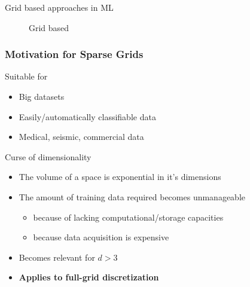 \begin{frame}
\begin{block}{Grid based approaches in ML}
\begin{figure}[!htb]
      \vspace{-12px}
      \caption{Grid based}
      \endminipage
    \end{figure}
  \end{block}
\end{frame}

\begin{frame}
  \frametitle{Motivation for Sparse Grids}
  \topline
  \vspace{-10px}
  \begin{block}{Suitable for}
    \begin{itemize}
      \item Big datasets
      \item Easily/automatically classifiable data
      \item Medical, seismic, commercial data
    \end{itemize}
  \end{block}
  \begin{block}{Curse of dimensionality}
    \begin{itemize}
    \item The volume of a space is exponential in it's dimensions
    \item The amount of training data required becomes unmanageable
      \begin{itemize}
      \item because of lacking computational/storage capacities
      \item because data acquisition is expensive
      \end{itemize}
    \item Becomes relevant for $d > 3$
    \item \textbf{Applies to full-grid discretization}
    \end{itemize}
  \end{block}
\end{frame}

